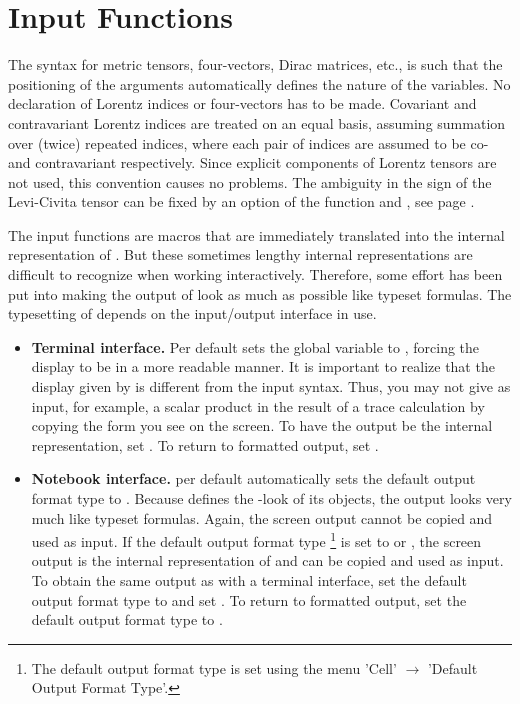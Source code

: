 \section{Input Functions}

The \fc syntax for metric tensors, four-vectors, Dirac matrices, etc.,
is such that the positioning of the arguments automatically defines the nature of the variables. %
No declaration of Lorentz indices or four-vectors has
to be made.
Covariant and contravariant Lorentz indices are treated on an equal basis,
assuming summation over (twice) repeated indices, where each pair of
indices are assumed to be co- and contravariant respectively.
Since explicit components of Lorentz tensors are not used, this
convention causes no problems.
The ambiguity in the sign of the Levi-Civita tensor can be
fixed by an option of the function  and
, see page \pageref{input}.

The input functions are macros that are immediately translated into
the internal representation of \fc. But these sometimes lengthy
internal representations are difficult to recognize when working
interactively. Therefore, some effort has been put into making the output
of \fc look as much as possible like typeset formulas.
The typesetting of \fc depends on the input/output interface in use.

\begin{itemize}
\item{\bf Terminal interface.} Per default \fc sets the global \mma variable
 to ,
forcing the display to be in a more readable manner.
It is important to realize that the display given by  is
different from the input syntax. Thus, you may not give as input,
for example, a scalar product in the result of a trace calculation
by copying the form you see on the screen. To have the output be the
internal representation, set . To return to formatted output,
set .
\item{\bf Notebook interface.} \fc per default automatically sets the
\mma default output format type to . Because \fc defines
the -look of its objects, the output looks very much like
typeset formulas. Again, the screen output cannot be copied and used
as input. If the \mma default output format type
\footnote{The \mma default output format type is set using the
menu 'Cell' $\rightarrow$ 'Default Output Format Type'.}
is set to
 or , the
screen output is the internal representation of \fc and can be copied
and used as input. To obtain the same output as with a terminal interface,
set the \mma default output format type to  and set
. To return to formatted output, set
the \mma default output format type to .
\end{itemize}

